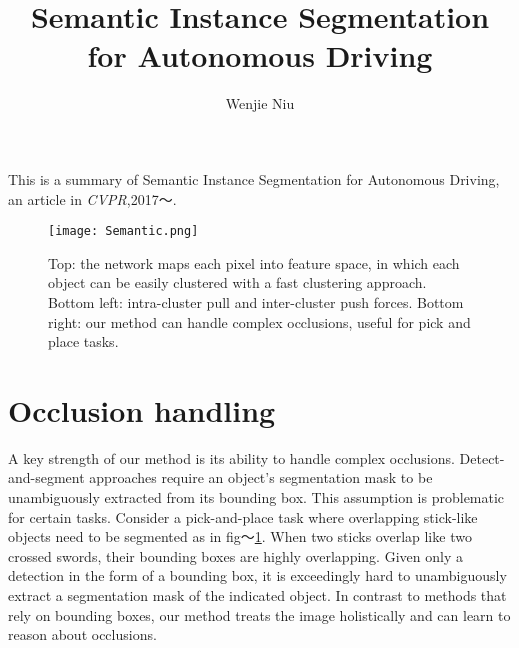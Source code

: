 \documentclass{article}
\author{Wenjie Niu}
\title{Semantic Instance Segmentation for Autonomous Driving}
\begin{document}
 
\twocolumn
\maketitle
This is a summary of Semantic Instance Segmentation for Autonomous Driving, an article in \emph{CVPR},2017～\cite{Brabandere_2017_CVPR_Workshops}.
\begin{figure}[H]
\centering
 \texttt{[image: Semantic.png]} 
 \caption{Top: the network maps each pixel into feature space, in
which each object can be easily clustered with a fast clustering
approach. Bottom left: intra-cluster pull and inter-cluster push
forces. Bottom right: our method can handle complex occlusions,
useful for pick and place tasks.}  
 \label{fig:Semantic}
 \end{figure}
\section{Occlusion handling}
A key strength of our method is its ability to handle complex occlusions. Detect-and-segment approaches require an object’s segmentation mask to be unambiguously extracted from its bounding box. This assumption is problematic for certain tasks. Consider
a pick-and-place task where overlapping stick-like objects
need to be segmented as in fig～\ref{fig:Semantic}. When two sticks overlap like two crossed swords, their bounding boxes are highly overlapping. Given only a detection in the form of a bounding box, it is exceedingly hard to unambiguously extract a segmentation mask of the indicated object. In contrast to methods that rely on bounding boxes, our method treats the image holistically and can learn to reason about occlusions.\par
\end{document}

